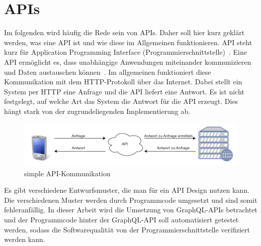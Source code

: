 \section{APIs}
\label{api}

Im folgenden wird häufig die Rede sein von APIs.
Daher soll hier kurz geklärt werden, was eine API ist und wie diese im Allgemeinen funktionieren.
API steht kurz für Application Programming Interface (Programmierschnittstelle)~\cite[vgl.]{api}.
Eine API ermöglicht es, dass unabhängige Anwendungen miteinander kommunizieren und Daten austauschen können~\cite{api}.
Im allgemeinen funktioniert diese Kommunikation mit dem HTTP-Protokoll über das Internet.
Dabei stellt ein System per HTTP eine Anfrage und die API liefert eine Antwort.
Es ist nicht festgelegt, auf welche Art das System die Antwort für die API erzeugt.
Dies hängt stark von der zugrundeliegenden Implementierung ab.

\begin{figure}[h!]
    \centering
    \includegraphics[width=\textwidth,height=\textheight,keepaspectratio]{img/webapi}
    \caption{simple API-Kommunikation}
    \label{basicapi}
\end{figure}

Es gibt verschiedene Entwurfsmuster, die man für ein API Design nutzen kann.
Die verschiedenen Muster werden durch Programmcode umgesetzt und sind somit fehleranfällig.
In dieser Arbeit wird die Umsetzung von GraphQL-APIs betrachtet und der Programmcode hinter der GraphQL-API
soll automatisiert getestet werden, sodass die Softwarequalität von der Programmierschnittstelle verifiziert werden kann.

\newpage